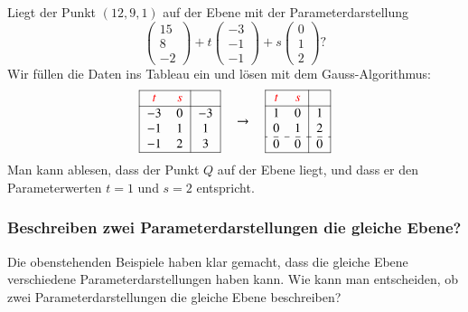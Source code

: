 \begin{beispiel}
Liegt der Punkt $(12,9,1)$ auf der Ebene mit der Parameterdarstellung
\[
\begin{pmatrix}15\\8\\-2\end{pmatrix}
+t
\begin{pmatrix}-3\\-1\\-1\end{pmatrix}
+s
\begin{pmatrix}0\\1\\2\end{pmatrix}
?
\]
\smallskip
Wir füllen die Daten ins Tableau ein und lösen mit dem Gauss-Algorithmus:
\[
\begin{tabular}{|>{$}c<{$}>{$}c<{$}|>{$}c<{$}|}
\hline
\color{red}t&\color{red}s&\\
\hline
-3& 0&-3\\
-1& 1& 1\\
-1& 2& 3\\
\hline
\end{tabular}
\quad\rightarrow\quad
\begin{tabular}{|>{$}c<{$}>{$}c<{$}|>{$}c<{$}|}
\hline
\color{red}t&\color{red}s&\\
\hline
   1&  0&  1\\
   0&  1&  2\\
\hdashline
   0&  0&  0\\
\hline
\end{tabular}
\]
Man kann ablesen, dass der Punkt $Q$ auf der Ebene liegt, und dass
er den Parameterwerten $t=1$ und $s=2$ entspricht.
\end{beispiel}

\subsubsection{Beschreiben zwei Parameterdarstellungen die gleiche Ebene?}
Die obenstehenden Beispiele haben klar gemacht, dass die gleiche Ebene
verschiedene Parameterdarstellungen haben kann.
Wie kann man entscheiden, ob zwei Parameterdarstellungen die gleiche
Ebene beschreiben?

